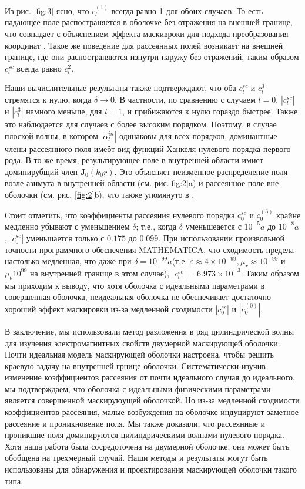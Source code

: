 \documentclass[a4paper, 12pt]{article}
\begin{document}
Из рис. \ref{fig:3} ясно, что $c_l^{(1)}$ всегда равно 1 для обоих случаев. То есть падающее поле распостраняется в 
оболочке без отражения на внешней границе, что совпадает с объяснением эффекта маскивроки для подхода преобразования 
координат \cite{1}. Такое же поведение для рассеянных полей возникает на внешней границе, где они распостраняются 
изнутри наружу без отражений, таким образом $c_l^{sc}$ всегда равно $c_l^2$.

Наши вычислительные результаты также подтверждают, что оба $c_l^{sc}$ и $c_l^3$ стремятся к нулю, когда $\delta \to 0$.
В частности, по сравнению с случаем $l=0$, $|c_l^{sc}|$ и $|c_l^3|$ намного меньше, для $l=1$, и прибижаются к нулю гораздо
быстрее. Также это наблюдается для случаев с более высоким порядком. Поэтому, в случае плоской волны, в котором 
$|\alpha_l^{in}|$ одинаковы для всех порядков, доминантные члены рассеянного поля имебт вид функций Ханкеля нулевого 
порядка первого рода. В то же время, результирующее поле в внутренней области имиет доминирубщий член $\mathbf{J}_0(k_0r)$.
Это объясняет неизменное распределение поля возле азимута в внутренней области (см. рис.\ref{fig:2}a) и рассеянное поле 
вне оболочки (см. рис. \ref{fig:2}b), что также упомянуто в \cite{6}.

Стоит отметить, что коэффициенты рассеяния нулевого порядка $c_0^{sc}$ и $c_0^{(3)}$ крайне медленно убывают с уменьшением
$\delta$; т.е., когда $\delta$ уменьшеается с $10^{-5}a$ до $10^{-8}a$, $|c_0^{sc}|$ уменьшается только с $0.175$ до 
$0.099$. При использовании произвольной точности программного обеспечения MATHEMATICA, что сходимость предела настолько
медленная, что даже при $\delta = 10^{-99}a$(т.е. $\varepsilon \approx 4 \times 10^{-99}, \mu_r \approx 10^{-99}$ и 
$\mu_\theta 10^{99}$ на внутренней границе в этом случае), $|c_l^{sc}| = 6.973 \times 10^{-3}$. Таким образом мы приходим
к выводу, что хотя оболочка с идеальными параметрами в \cite{1} совершенная оболочка, неидеальная оболочка не обеспечивает
достаточно хороший эффект маскировки из-за медленной сходимости $|c_0^{sc}|$ и $|c_0^{(0)}|$.

В заключение, мы использовали метод разложения в ряд цилиндрической волны для изучения электромагнитных свойств двумерной
маскирующей оболочки. Почти идеальная модель маскирующей оболочки настроена, чтобы решить краевую задачу на внутренней
грнице оболочки. Систематически изучив изменение коэффициентов рассеяния от почти идеального случая до идеального, мы
подтверждаем, что оболочка с идеальными физическими параметрами является совершенной маскируюущей оболочкой. Но из-за
медленной сходимости коэффициентов рассеяния, малые возбуждения на оболочке индуцируют заметное рассеяние и проникновение
поля. Мы также доказали, что рассеянные и проникшие поля доминируются цилиндрическими волнами нулевого порядка. Хотя
наша работа была сосредоточена на двумерной оболочке, она может быть обобщена на трехмерный случай. Наши методы и 
результаты могут быть использованы для обнаружения и проектирования маскирующей оболочки такого типа.
\end{document}
